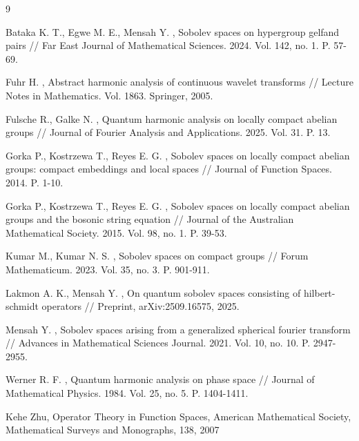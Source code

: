 \documentclass[11pt,a4paper]{article}
\theoremstyle{definition}
\begin{document}
\bigskip  



\begin{thebibliography}{9}

Bataka K. T., Egwe M. E., Mensah Y. , Sobolev spaces on hypergroup gelfand pairs // 
Far East Journal of Mathematical Sciences. 2024. Vol. 142, no. 1. P. 57-69.

Fuhr H. , Abstract harmonic analysis of continuous wavelet transforms // 
Lecture Notes in Mathematics. Vol. 1863. Springer, 2005.

Fulsche R., Galke N. , Quantum harmonic analysis on locally compact abelian groups // 
Journal of Fourier Analysis and Applications. 2025. Vol. 31. P. 13.

Gorka P., Kostrzewa T., Reyes E. G. , Sobolev spaces on locally compact abelian groups: compact embeddings and local spaces // 
Journal of Function Spaces. 2014. P. 1-10.

Gorka P., Kostrzewa T., Reyes E. G. , Sobolev spaces on locally compact abelian groups and the bosonic string equation // 
Journal of the Australian Mathematical Society. 2015. Vol. 98, no. 1. P. 39-53.

Kumar M., Kumar N. S. , Sobolev spaces on compact groups // 
Forum Mathematicum. 2023. Vol. 35, no. 3. P. 901-911.

Lakmon A. K., Mensah Y. , On quantum sobolev spaces consisting of hilbert-schmidt operators // 
Preprint, arXiv:2509.16575, 2025.

Mensah Y.  , Sobolev spaces arising from a generalized spherical fourier transform // 
Advances in Mathematical Sciences Journal. 2021. Vol. 10, no. 10. P. 2947-2955.

Werner R. F. , Quantum harmonic analysis on phase space // 
Journal of Mathematical Physics. 1984. Vol. 25, no. 5. P. 1404-1411.


Kehe Zhu, Operator Theory in Function Spaces,  American Mathematical Society, Mathematical Surveys and Monographs, 138, 2007
\end{thebibliography}
\end{document}
